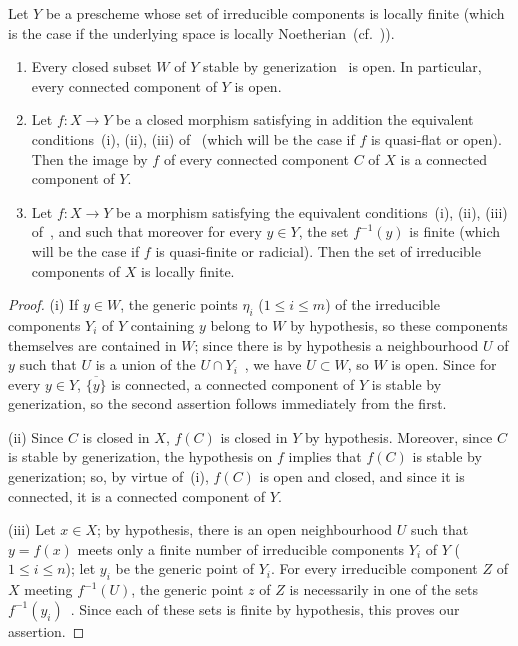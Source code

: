 \begin{proposition}[2.3.6]
\label{IV.2.3.6}
Let $Y$ be a prescheme whose set of irreducible components is locally finite \textnormal{(}which is the case if the underlying space is locally Noetherian~(cf.~)\textnormal{)}.
\begin{enumerate}[label=(\roman*)]
  \item Every closed subset $W$ of $Y$ stable by generization~ is open. In particular, every connected component of $Y$ is open.
  \item Let $f:X\to Y$ be a closed morphism satisfying in addition the equivalent conditions~(i), (ii), (iii) of~ \textnormal{(}which will be the case if $f$ is quasi-flat or open\textnormal{)}. Then the image by $f$ of every connected component $C$ of $X$ is a connected component of $Y$.
  \item Let $f:X\to Y$ be a morphism satisfying the equivalent conditions~(i), (ii), (iii) of~, and such that moreover for every $y\in Y$, the set $f^{-1}(y)$ is finite \textnormal{(}which will be the case if $f$ is quasi-finite or radicial\textnormal{)}. Then the set of irreducible components of $X$ is locally finite.
\end{enumerate}
\end{proposition}

\begin{proof}
(i) If $y\in W$, the generic points $\eta_i$ ($1\leq i\leq m$) of the irreducible components $Y_i$ of $Y$ containing $y$ belong to $W$ by hypothesis, so these components themselves are contained in $W$; since there is by hypothesis a neighbourhood $U$ of $y$ such that $U$ is a union of the $U\cap Y_i$~, we have $U\subset W$, so $W$ is open.
Since for every $y\in Y$, $\overline{\{y\}}$ is connected, a connected component of $Y$ is stable by generization, so the second assertion follows immediately from the first.

(ii) Since $C$ is closed in $X$, $f(C)$ is closed in $Y$ by hypothesis.
Moreover, since $C$ is stable by generization, the hypothesis on $f$ implies that $f(C)$ is stable by generization; so, by virtue of~(i), $f(C)$ is open and closed, and since it is connected, it is a connected component of $Y$.

(iii) Let $x\in X$; by hypothesis, there is an open neighbourhood $U$ such that $y=f(x)$ meets only a finite number of irreducible components $Y_i$ of $Y$ ($1\leq i\leq n$); let $y_i$ be the generic point of $Y_i$.
For every irreducible component $Z$ of $X$ meeting $f^{-1}(U)$, the generic point $z$ of $Z$ is necessarily in one of the sets $f^{-1}(y_i)$~.
Since each of these sets is finite by hypothesis, this proves our assertion.
\end{proof}

